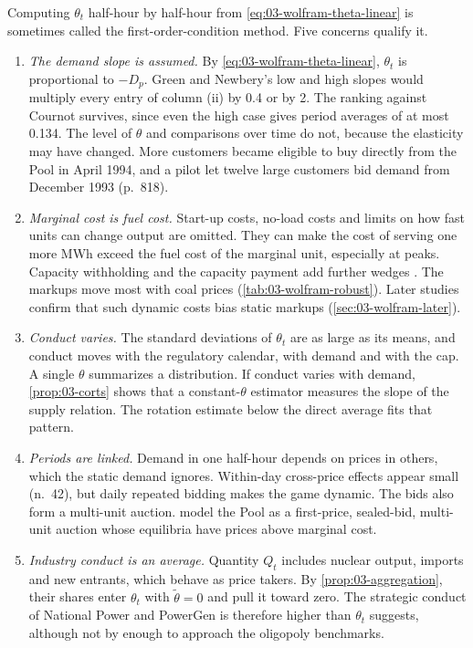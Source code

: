 Computing $\theta_t$ half-hour by half-hour from \eqref{eq:03-wolfram-theta-linear} is sometimes called the
first-order-condition method. Five concerns qualify it.
\begin{enumerate}[label=(\arabic*)]
\item \emph{The demand slope is assumed.} By \eqref{eq:03-wolfram-theta-linear}, $\theta_t$ is proportional to $-D_p$.
  Green and Newbery's low and high slopes would multiply every entry of column (ii) by 0.4 or by 2. The ranking against
  Cournot survives, since even the high case gives period averages of at most 0.134. The level of $\theta$ and comparisons over time do
  not, because the elasticity may have changed. More customers became eligible to buy directly from the Pool in April
  1994, and a pilot let twelve large customers bid demand from December 1993 (p.~818).
\item \emph{Marginal cost is fuel cost.} Start-up costs, no-load costs and limits on how fast units can change output
  are omitted. They can make the cost of serving one more MWh exceed the fuel cost of the marginal unit, especially at
  peaks. Capacity
  withholding and the capacity payment add further wedges \citep{WolakPatrick1997}. The markups move most with coal
  prices (\cref{tab:03-wolfram-robust}). Later studies confirm that such dynamic costs bias static markups
  (\cref{sec:03-wolfram-later}).
\item \emph{Conduct varies.} The standard deviations of $\theta_t$ are as large as its means, and conduct moves with
  the regulatory calendar, with demand and with the cap. A single $\theta$ summarizes a distribution. If conduct varies
  with demand, \cref{prop:03-corts} shows that a constant-$\theta$ estimator measures the slope of the supply relation.
  The rotation estimate below the direct average fits that pattern.
\item \emph{Periods are linked.} Demand in one half-hour depends on prices in others, which the static demand ignores.
  Within-day cross-price effects appear small (n.~42), but daily repeated bidding makes the game dynamic. The bids also
  form a multi-unit auction. \citet{VonDerFehrHarbord1993} model the Pool as a first-price, sealed-bid, multi-unit
  auction whose equilibria have prices above marginal cost.
\item \emph{Industry conduct is an average.} Quantity $Q_t$ includes nuclear output, imports and new entrants, which
  behave as price takers. By \cref{prop:03-aggregation}, their shares enter $\theta_t$ with $\tilde\theta = 0$ and pull
  it toward zero. The strategic conduct of National Power and PowerGen is therefore higher than $\theta_t$ suggests,
  although not by enough to approach the oligopoly benchmarks.
\end{enumerate}

